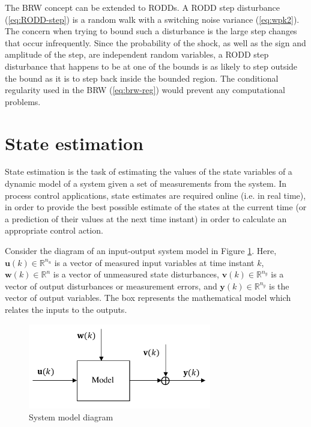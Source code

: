 The BRW concept can be extended to RODDs. A RODD step disturbance (\ref{eq:RODD-step}) is a random walk with a switching noise variance (\ref{eq:wpk2}). The concern when trying to bound such a disturbance is the large step changes that occur infrequently. Since the probability of the shock, as well as the sign and amplitude of the step, are independent random variables, a RODD step disturbance that happens to be at one of the bounds is as likely to step outside the bound as it is to step back inside the bounded region. The conditional regularity used in the BRW (\ref{eq:brw-reg}) would prevent any computational problems. 



\section{State estimation}

State estimation is the task of estimating the values of the state variables of a dynamic model of a system given a set of measurements from the system. In process control applications, state estimates are required online (i.e. in real time), in order to provide the best possible estimate of the states at the current time (or a prediction of their values at the next time instant) in order to calculate an appropriate control action.

Consider the diagram of an input-output system model in Figure \ref{fig:model_diag_uwvy}. Here, $\mathbf{u}(k) \in \mathbb{R}^{n_u}$ is a vector of measured input variables at time instant $k$, $\mathbf{w}(k) \in \mathbb{R}^n$ is a vector of unmeasured state disturbances, $\mathbf{v}(k) \in \mathbb{R}^{n_y}$ is a vector of output disturbances or measurement errors, and $\mathbf{y}(k) \in \mathbb{R}^{n_y}$ is the vector of output variables. The box represents the mathematical model which relates the inputs to the outputs.

\begin{figure}[htp]
	\centering
	\includegraphics[width=8cm]{images/model_diag_uwvy.pdf}
	\caption{System model diagram}
	\label{fig:model_diag_uwvy}
\end{figure}

